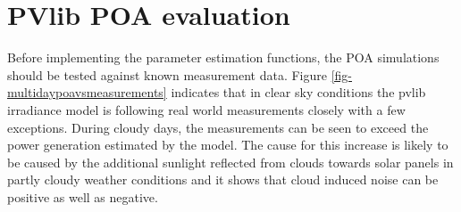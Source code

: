 







 


\newpage
\section{PVlib POA evaluation}

Before implementing the parameter estimation functions, the POA simulations should be tested against known measurement data. Figure \ref{fig-multidaypoavsmeasurements} indicates that in clear sky conditions the pvlib irradiance model is following real world measurements closely with a few exceptions. During cloudy days, the measurements can be seen to exceed the power generation estimated by the model. The cause for this increase is likely to be caused by the additional sunlight reflected from clouds towards solar panels in partly cloudy weather conditions and it shows that cloud induced noise can be positive as well as negative. 

